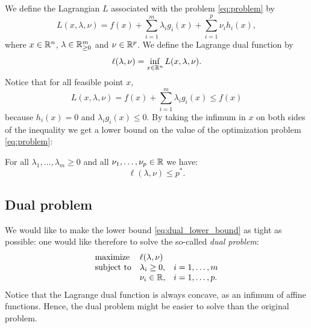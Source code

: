 \documentclass[11pt,nocut]{article}
\begin{document}
We define the Lagrangian $L$ associated with the problem \eqref{eq:problem} by
\begin{equation}
	L(x,\lambda,\nu) = 
	f(x) + \sum_{i=1}^m \lambda_i g_i(x) + \sum_{i=1}^p \nu_i h_i(x),
\end{equation}
where $x \in \mathbb{R}^n$, $\lambda \in \mathbb{R}_{\geq 0}^m$ and $\nu \in \mathbb{R}^p$. We define the Lagrange dual function by
$$
\ell(\lambda,\nu) = \inf_{x \in \mathbb{R}^n} L(x,\lambda,\nu).
$$
Notice that for all feasible point $x$,
$$
L(x,\lambda,\nu)
= f(x) + \sum_{i=1}^m \lambda_i g_i(x) \leq f(x)
$$
because $h_i(x) = 0$ and $\lambda_i g_i(x) \leq 0$. By taking the infimum in $x$ on both sides of the inequality we get a lower bound on the value of the optimization problem \eqref{eq:problem}:
\begin{proposition}
	For all $\lambda_1, \dots, \lambda_m \geq 0$ and all $\nu_1, \dots,\nu_p \in \mathbb{R}$ we have:
	\begin{equation}\label{eq:dual_lower_bound}
		\ell(\lambda,\nu) \leq p^*.
	\end{equation}
\end{proposition}

\subsection{Dual problem}

We would like to make the lower bound \eqref{eq:dual_lower_bound} as tight as possible: one would like therefore to solve the so-called \emph{dual problem}:
\begin{equation}\label{eq:dual_problem}
	\begin{array}{lll}
		\text{maximize} & \ell(\lambda,\nu) & \\
		\text{subject to} & \lambda_i \geq 0, & i=1, \dots, m \\
						  & \nu_i \in \mathbb{R}, & i=1, \dots, p.
	\end{array}
\end{equation}
Notice that the Lagrange dual function is always concave, as an infimum of affine functions. Hence, the dual problem might be easier to solve than the original problem.
\\
\end{document}
